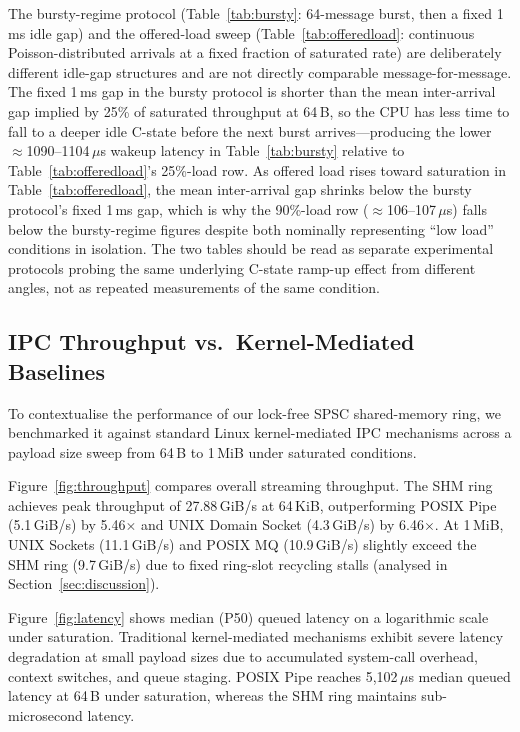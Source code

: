 \documentclass[10pt,conference]{IEEEtran}
\begin{document}
The bursty-regime protocol (Table~\ref{tab:bursty}: 64-message burst,
then a fixed 1\,ms idle gap) and the offered-load sweep
(Table~\ref{tab:offeredload}: continuous Poisson-distributed arrivals at
a fixed fraction of saturated rate) are deliberately different idle-gap
structures and are not directly comparable message-for-message.  The
fixed 1\,ms gap in the bursty protocol is shorter than the mean
inter-arrival gap implied by 25\% of saturated throughput at 64\,B, so
the CPU has less time to fall to a deeper idle C-state before the next
burst arrives---producing the lower
$\approx$1090--1104\,$\mu$s wakeup latency in Table~\ref{tab:bursty}
relative to Table~\ref{tab:offeredload}'s 25\%-load row.  As offered
load rises toward saturation in Table~\ref{tab:offeredload}, the mean
inter-arrival gap shrinks below the bursty protocol's fixed 1\,ms gap,
which is why the 90\%-load row ($\approx$106--107\,$\mu$s) falls below
the bursty-regime figures despite both nominally representing ``low
load'' conditions in isolation.  The two tables should be read as
separate experimental protocols probing the same underlying C-state
ramp-up effect from different angles, not as repeated measurements of the
same condition.

\subsection{IPC Throughput vs.\ Kernel-Mediated Baselines}

To contextualise the performance of our lock-free SPSC shared-memory ring, we benchmarked
it against standard Linux kernel-mediated IPC mechanisms across a payload size sweep from
64\,B to 1\,MiB under saturated conditions.

Figure~\ref{fig:throughput} compares overall streaming throughput. The SHM ring achieves
peak throughput of 27.88\,GiB/s at 64\,KiB, outperforming POSIX Pipe (5.1\,GiB/s) by 5.46$\times$
and UNIX Domain Socket (4.3\,GiB/s) by 6.46$\times$. At 1\,MiB, UNIX Sockets (11.1\,GiB/s)
and POSIX MQ (10.9\,GiB/s) slightly exceed the SHM ring (9.7\,GiB/s) due to fixed ring-slot
recycling stalls (analysed in Section~\ref{sec:discussion}).

Figure~\ref{fig:latency} shows median (P50) queued latency on a logarithmic scale under
saturation. Traditional kernel-mediated mechanisms exhibit severe latency degradation at small
payload sizes due to accumulated system-call overhead, context switches, and queue staging.
POSIX Pipe reaches 5,102\,$\mu$s median queued latency at 64\,B under saturation, whereas
the SHM ring maintains sub-microsecond latency.
\end{document}
